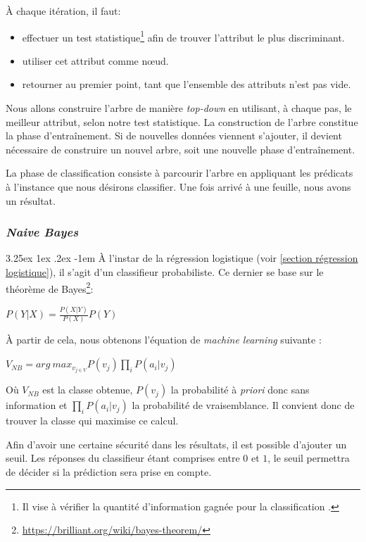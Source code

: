 \documentclass[a4paper, 11pt]{article}
\makeatletter
\renewcommand\paragraph{\@startsection{paragraph}{5}{\z@}%
  {3.25ex \@plus1ex \@minus.2ex}%
  {-1em}%
  {\normalfont\normalsize\bfseries}}
\makeatother
\begin{document}
À chaque itération, il faut:
\begin{itemize}
 \item effectuer un test statistique\footnote{Il vise à vérifier la quantité d'information gagnée pour 
 la classification \cite{id3}.} afin de trouver l'attribut le plus discriminant.
 \item utiliser cet attribut comme nœud.
 \item retourner au premier point, tant que l'ensemble des attributs n'est pas vide.
\end{itemize}
Nous allons construire l'arbre de manière \textit{top-down} en utilisant, à chaque pas, le meilleur attribut, selon notre test statistique. La construction de l'arbre constitue la phase d'entraînement. Si de nouvelles données viennent s'ajouter, il devient nécessaire de construire un nouvel arbre, soit une nouvelle phase d'entraînement.

La phase de classification consiste à parcourir l'arbre en appliquant les prédicats à l'instance que nous désirons classifier. Une fois arrivé à une feuille, nous avons un résultat.


\subsubsection{\textit{Naive Bayes}}\label{section naive bayes}
\paragraph{}
À l'instar de la régression logistique (voir \ref{section régression logistique}), il s'agit d'un classifieur probabiliste. 
Ce dernier se base sur le théorème de Bayes\footnote{\url{https://brilliant.org/wiki/bayes-theorem/}}:
\begin{center}
$P(Y|X) = \frac{P(X|Y)}{P(X)}P(Y)$
\end{center}

À partir de cela, nous obtenons l'équation de \textit{machine learning} suivante \cite{machine_learning_automated_trading}:
\begin{center}
$V_{NB} = arg\ max_{v_{j \in V}} P(v_j) \prod\limits_i P(a_i | v_j)$
\end{center}
Où $V_{NB}$ est la classe obtenue, $P(v_j)$ la probabilité à \textit{priori} donc sans information 
et $\prod\limits_i P(a_i | v_j)$ la probabilité de vraisemblance.
Il convient donc de trouver la classe qui maximise ce calcul.

Afin d'avoir une certaine sécurité dans les résultats, il est possible d'ajouter un seuil. 
Les réponses du classifieur étant comprises entre $0$ et $1$, le seuil permettra de décider si la prédiction sera prise en compte.
\end{document}
